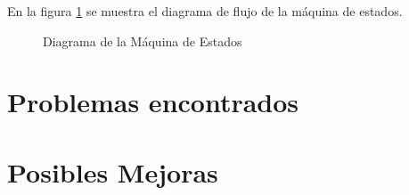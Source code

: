 En la figura \ref{fig:state_machine} se muestra el diagrama de flujo de la máquina de estados. 

\begin{figure}
\centering
\scalebox{.4}{}
\caption{Diagrama de la Máquina de Estados}
\label{fig:state_machine}
\end{figure}



\newpage
\section{Problemas encontrados}



\newpage
\section{Posibles Mejoras}


\newpage


%
%
